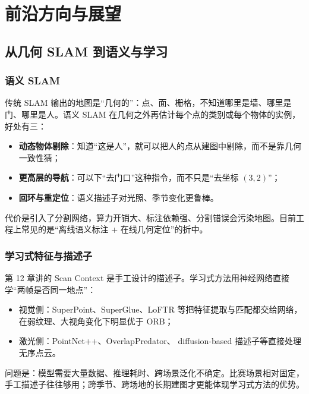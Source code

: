 \chapter{前沿方向与展望}\label{ch:24-frontier}


\section{从几何 SLAM 到语义与学习}\label{sec:24-semantic}

\subsection{语义 SLAM}

传统 SLAM 输出的地图是“几何的”：点、面、栅格，不知道哪里是墙、哪里是门、哪里是人。语义 SLAM 在几何之外再估计每个点的类别或每个物体的实例，好处有三：
\begin{itemize}
  \item \textbf{动态物体剔除}：知道“这是人”，就可以把人的点从建图中剔除，而不是靠几何一致性猜；
  \item \textbf{更高层的导航}：可以下“去门口”这种指令，而不只是“去坐标 $(3,2)$”；
  \item \textbf{回环与重定位}：语义描述子对光照、季节变化更鲁棒。
\end{itemize}
代价是引入了分割网络，算力开销大、标注依赖强、分割错误会污染地图。目前工程上常见的是“离线语义标注 + 在线几何定位”的折中。

\subsection{学习式特征与描述子}

第 12 章讲的 Scan Context 是手工设计的描述子。学习式方法用神经网络直接学“两帧是否同一地点”：
\begin{itemize}
  \item 视觉侧：SuperPoint、SuperGlue、LoFTR 等把特征提取与匹配都交给网络，在弱纹理、大视角变化下明显优于 ORB；
  \item 激光侧：PointNet++、OverlapPredator、 diffusion-based 描述子等直接处理无序点云。
\end{itemize}
问题是：模型需要大量数据、推理耗时、跨场景泛化不确定。比赛场景相对固定，手工描述子往往够用；跨季节、跨场地的长期建图才更能体现学习式方法的优势。

